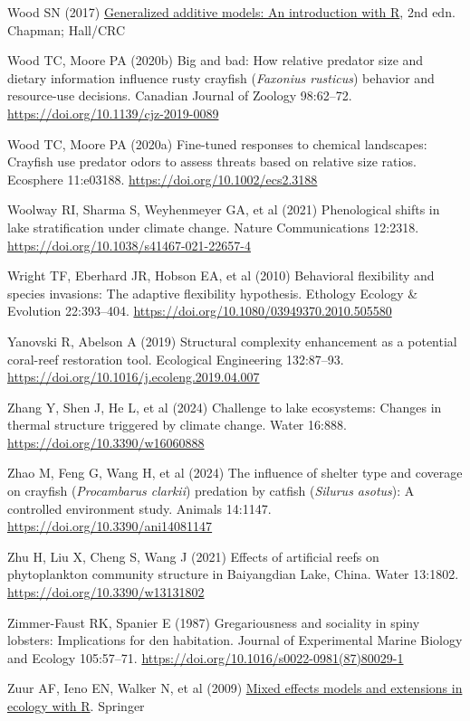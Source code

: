 \documentclass[
  12pt,
  a4paper,
  oneside]{scrbook}
\newlength{\cslhangindent}
\newenvironment{CSLReferences}[2] %
 {\begin{list}{}{%
  \setlength{\itemindent}{0pt}
  \setlength{\leftmargin}{0pt}
  \setlength{\parsep}{0pt}
  \ifodd #1
   \setlength{\leftmargin}{\cslhangindent}
   \setlength{\itemindent}{-1\cslhangindent}
  \fi
  \setlength{\itemsep}{#2\baselineskip}}}
 {\end{list}}
\renewenvironment{CSLReferences}[2]
   {\begin{list}{}{%
    \setlength{\itemindent}{0pt}
    \setlength{\leftmargin}{0pt}
    \setlength{\parsep}{0pt}
    \ifodd #1
     \setlength{\leftmargin}{\cslhangindent}
     \setlength{\itemindent}{-1\cslhangindent}
    \fi
    \setlength{\itemsep}{0.3\baselineskip}}}
   {\end{list}}%
\begin{document}
\begin{CSLReferences}{1}{1}
Wood SN (2017) \href{https://doi.org/10.1201/9781315370279}{Generalized
additive models: An introduction with {R}}, 2nd edn. Chapman; Hall/CRC

Wood TC, Moore PA (2020b) Big and bad: How relative predator size and
dietary information influence rusty crayfish ({\emph{Faxonius
rusticus}}) behavior and resource-use decisions. Canadian Journal of
Zoology 98:62--72. \url{https://doi.org/10.1139/cjz-2019-0089}

Wood TC, Moore PA (2020a) Fine-tuned responses to chemical landscapes:
Crayfish use predator odors to assess threats based on relative size
ratios. Ecosphere 11:e03188. \url{https://doi.org/10.1002/ecs2.3188}

Woolway RI, Sharma S, Weyhenmeyer GA, et al (2021) Phenological shifts
in lake stratification under climate change. Nature Communications
12:2318. \url{https://doi.org/10.1038/s41467-021-22657-4}

Wright TF, Eberhard JR, Hobson EA, et al (2010) Behavioral flexibility
and species invasions: The adaptive flexibility hypothesis. Ethology
Ecology \& Evolution 22:393--404.
\url{https://doi.org/10.1080/03949370.2010.505580}

Yanovski R, Abelson A (2019) Structural complexity enhancement as a
potential coral-reef restoration tool. Ecological Engineering
132:87--93. \url{https://doi.org/10.1016/j.ecoleng.2019.04.007}

Zhang Y, Shen J, He L, et al (2024) Challenge to lake ecosystems:
Changes in thermal structure triggered by climate change. Water 16:888.
\url{https://doi.org/10.3390/w16060888}

Zhao M, Feng G, Wang H, et al (2024) The influence of shelter type and
coverage on crayfish ({\emph{Procambarus clarkii}}) predation by catfish
({\emph{Silurus asotus}}): A controlled environment study. Animals
14:1147. \url{https://doi.org/10.3390/ani14081147}

Zhu H, Liu X, Cheng S, Wang J (2021) Effects of artificial reefs on
phytoplankton community structure in {Baiyangdian Lake, China}. Water
13:1802. \url{https://doi.org/10.3390/w13131802}

Zimmer-Faust RK, Spanier E (1987) Gregariousness and sociality in spiny
lobsters: Implications for den habitation. Journal of Experimental
Marine Biology and Ecology 105:57--71.
\url{https://doi.org/10.1016/s0022-0981(87)80029-1}

Zuur AF, Ieno EN, Walker N, et al (2009)
\href{https://doi.org/10.1007/978-0-387-87458-6}{Mixed effects models
and extensions in ecology with {R}}. Springer

\end{CSLReferences}
\end{document}
